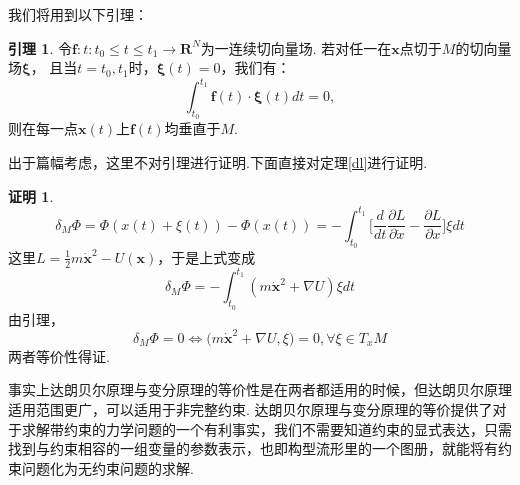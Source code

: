 \documentclass[UTF8,10.5pt,a4paper]{ctexart}
\numberwithin{equation}{section}
\theoremstyle{definition}
\newtheorem{lem}{引理\hspace{0.05pt}}[section]
\theoremstyle{definition}
\newtheorem*{pf}{证明}
\begin{document}
我们将用到以下引理：
\begin{lem}
令$\textbf{f}:{t:t_0\leq t\leq t_1}\rightarrow \textbf{R}^N$为一连续切向量场.
若对任一在$\textbf{x}$点切于$M$的切向量场$\mathbf{\xi}$，
且当$t=t_0,t_1$时，$\mathbf{\xi}(t)=0$，我们有：
$$\int_{t_0}^{t_1}\textbf{f}(t)\cdot \mathbf{\xi}(t)dt=0 ,$$
则在每一点$\textbf{x}(t)$上$\textbf{f}(t)$均垂直于$M$.
\end{lem}
出于篇幅考虑，这里不对引理进行证明.下面直接对定理\ref{dl}进行证明.
\begin{pf}
$$\delta_M\Phi=\Phi(x(t)+\xi(t))-\Phi(x(t))=-\int_{t_0}^{t_1}\big[\frac{d}{dt}\frac{\partial L}{\partial \dot{x}}-\frac{\partial L}{\partial x}\big]\xi dt$$
这里$L=\frac{1}{2}m\dot{\textbf{x}}^2-U(\textbf{x})$，于是上式变成
$$\delta_M\Phi=-\int_{t_0}^{t_1}(m\dot{\textbf{x}}^2+\nabla U)\xi dt$$
由引理，
$$\delta_M\Phi=0\Leftrightarrow \big(m\dot{\textbf{x}}^2+\nabla U,\xi\big)=0, \forall \xi \in T_xM$$
两者等价性得证.
\end{pf}
事实上达朗贝尔原理与变分原理的等价性是在两者都适用的时候，但达朗贝尔原理适用范围更广，可以适用于非完整约束\cite{CL1}.
达朗贝尔原理与变分原理的等价提供了对于求解带约束的力学问题的一个有利事实，我们不需要知道约束的显式表达，只需找到与约束相容的一组变量的参数表示，也即构型流形里的一个图册，就能将有约束问题化为无约束问题的求解.
\end{document}
